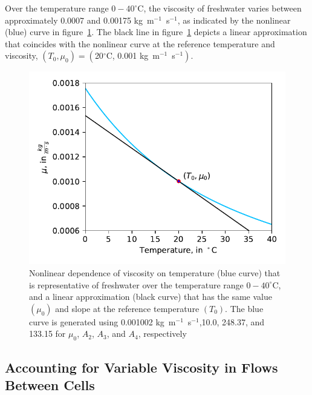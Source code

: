 Over the temperature range $0-40^{\circ}$C, the viscosity of freshwater varies between approximately 0.0007 and 0.00175 kg~m$^{-1}$~s$^{-1}$, as indicated by the nonlinear (blue) curve in figure~\ref{fig:viscosityrelation}. The black line in figure~\ref{fig:viscosityrelation} depicts a linear approximation that coincides with the nonlinear curve at the reference temperature and viscosity, $\left ( T_0, \mu_0 \right ) = \left(\right.$20$^{\circ}$C, 0.001 kg~m$^{-1}$~s$^{-1}\left.\right)$.

\begin{figure}
	\begin{center}
	\includegraphics{./Figures/VSCnonlinear.pdf}
	\caption[Graph showing the nonlinear response in the viscosity as temperature changes]{Nonlinear dependence of viscosity on temperature (blue curve) that is representative of freshwater over the temperature range $0-40^{\circ}$C, and a linear approximation (black curve) that has the same value $\left ( \mu_0 \right )$ and slope at the reference temperature $\left ( T_0 \right )$.  The blue curve is generated using 0.001002 kg~m$^{-1}$~s$^{-1}$,10.0, 248.37, and 133.15 for $\mu_0$, $A_2$, $A_3$, and $A_4$, respectively}
	\label{fig:viscosityrelation}
	\end{center}
\end{figure}

\subsection{Accounting for Variable Viscosity in Flows Between Cells} \label{sec:gwfvsc}

